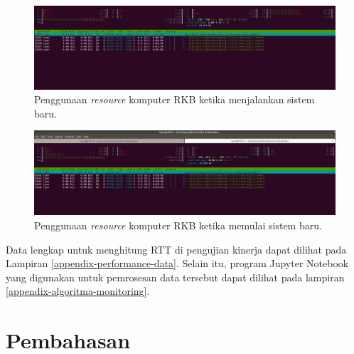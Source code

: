 \begin{figure}[!htbp]
	\centering
	\includegraphics[width=1.0\textwidth]{resources/chapter-4/resource-usage-new-hils-rkb-startup.png}
	\caption{Penggunaan \textit{resource} komputer RKB ketika menjalankan sistem baru.}
	\label{chapter-4-fig-perf-result-resource-usage-rkb}
\end{figure}
\begin{figure}[!htbp]
	\centering
	\includegraphics[width=1.0\textwidth]{resources/chapter-4/resource-usage-new-hils-rkb.png}
	\caption{Penggunaan \textit{resource} komputer RKB ketika memulai sistem baru.}
	\label{chapter-4-fig-perf-result-resource-usage-rkb-startup}
\end{figure}

Data lengkap untuk menghitung RTT di pengujian kinerja dapat dilihat pada
Lampiran \ref{appendix-performance-data}. Selain itu, program Jupyter Notebook
yang digunakan untuk pemrosesan data tersebut dapat dilihat pada lampiran
\ref{appendix-algoritma-monitoring}.

\section{Pembahasan}
\blindtext
